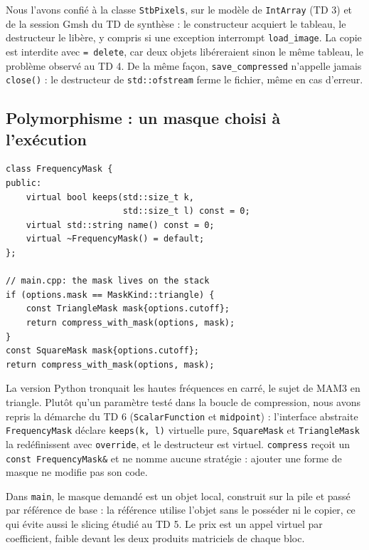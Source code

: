 \documentclass[10pt,a4paper]{article}
\newcommand{\code}[1]{\texttt{#1}}
\begin{document}
\smallskip
Nous l'avons confié à la classe \code{StbPixels}, sur le modèle de \code{IntArray} (TD 3) et de
la session Gmsh du TD de synthèse : le constructeur acquiert le tableau, le destructeur le libère,
y compris si une exception interrompt \code{load\_image}. La copie est interdite avec
\code{= delete}, car deux objets libéreraient sinon le même tableau, le problème observé au TD 4.
De la même façon, \code{save\_compressed} n'appelle jamais \code{close()} : le destructeur de
\code{std::ofstream} ferme le fichier, même en cas d'erreur.

\subsection{Polymorphisme : un masque choisi à l'exécution}
\begin{minipage}[t]{0.45\textwidth}
\vspace{0pt}
\begin{lstlisting}
class FrequencyMask {
public:
    virtual bool keeps(std::size_t k,
                       std::size_t l) const = 0;
    virtual std::string name() const = 0;
    virtual ~FrequencyMask() = default;
};

// main.cpp: the mask lives on the stack
if (options.mask == MaskKind::triangle) {
    const TriangleMask mask{options.cutoff};
    return compress_with_mask(options, mask);
}
const SquareMask mask{options.cutoff};
return compress_with_mask(options, mask);
\end{lstlisting}
\end{minipage}\hfill
\begin{minipage}[t]{0.525\textwidth}
\vspace{0pt}
La version Python tronquait les hautes fréquences en carré, le sujet de MAM3 en triangle. Plutôt
qu'un paramètre testé dans la boucle de compression, nous avons repris la démarche du TD 6
(\code{ScalarFunction} et \code{midpoint}) : l'interface abstraite \code{FrequencyMask} déclare
\code{keeps(k, l)} virtuelle pure, \code{SquareMask} et \code{TriangleMask} la redéfinissent avec
\code{override}, et le destructeur est virtuel. \code{compress} reçoit un
\code{const FrequencyMask\&} et ne nomme aucune stratégie : ajouter une forme de masque ne
modifie pas son code.
\end{minipage}

\smallskip
Dans \code{main}, le masque demandé est un objet local, construit sur la pile et passé par
référence de base : la référence utilise l'objet sans le posséder ni le copier, ce qui évite
aussi le slicing étudié au TD 5. Le prix est un appel virtuel par coefficient, faible devant les
deux produits matriciels de chaque bloc.
\end{document}
